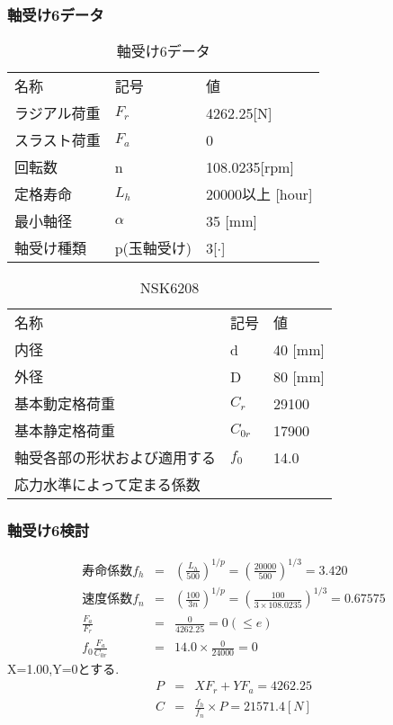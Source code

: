 \subsubsection{軸受け6データ}
\begin{table}[htb]
\begin{center}
  \caption{軸受け6データ}
  \begin{tabular}{lll} \hline
名称&記号&値\\
ラジアル荷重&$F_r$&4262.25[N]\\
スラスト荷重&$F_a$&0\\
回転数&n&108.0235[rpm]\\
定格寿命&$L_h$&20000以上 [hour]\\
最小軸径&$\alpha$&35 [mm]\\
軸受け種類&p(玉軸受け)&3[$\cdot$]\\
\hline
  \end{tabular}
\end{center}
\end{table}

\begin{table}[htb]
\begin{center}
  \caption{NSK6208}
  \begin{tabular}{lll} \hline
名称&記号&値\\
内径& d &40 [mm]\\
外径& D &80 [mm]\\
基本動定格荷重&$C_{r}$ &29100\\
基本静定格荷重&$C_{0r}$&17900\\
軸受各部の形状および適用する&$f_0$&14.0\\
応力水準によって定まる係数&&\\
\hline
  \end{tabular}
\end{center}
\end{table}


\subsubsection{軸受け6検討}
\begin{eqnarray}
寿命係数f_h &=& \left( \frac{L_h}{500} \right)^{1/p} = \left( \frac{20000}{500} \right)^{1/3} = 3.420\\
速度係数f_n &=& \left( \frac{100}{3n} \right)^{1/p} = \left( \frac{100}{3 \times 108.0235} \right)^{1/3} = 0.67575\\
\frac{F_a}{F_r} &=& \frac{0}{4262.25} = 0 (\leq e)\\
f_0\frac{F_a}{C_{0r}}&=& 14.0 \times \frac{0}{24000} = 0
\end{eqnarray}
X=1.00,Y=0とする.
\begin{eqnarray}
P &=& XF_r+YF_a = 4262.25\\
C &=& \frac{f_h}{f_n} \times P = 21571.4[N]
\end{eqnarray}

